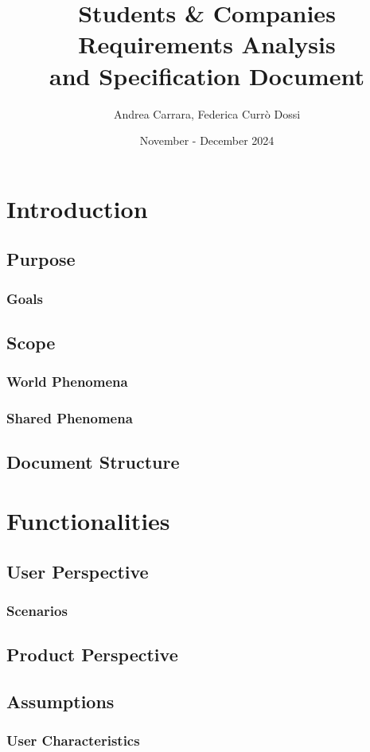 \documentclass[a4paper, oneside]{book}
\title{
  Students \& Companies \\
  \Huge Requirements Analysis \\
  and Specification Document
}
\author{Andrea Carrara, Federica Currò Dossi}
\date{November - December 2024}
\begin{document}
\maketitle

\tableofcontents

\chapter{Introduction}
\section{Purpose}
\subsection{Goals}
\section{Scope}
\subsection{World Phenomena}
\subsection{Shared Phenomena}
\section{Document Structure}

\chapter{Functionalities}
\section{User Perspective}
\subsection{Scenarios}
\section{Product Perspective}
\section{Assumptions}
\subsection{User Characteristics}
\end{document}
